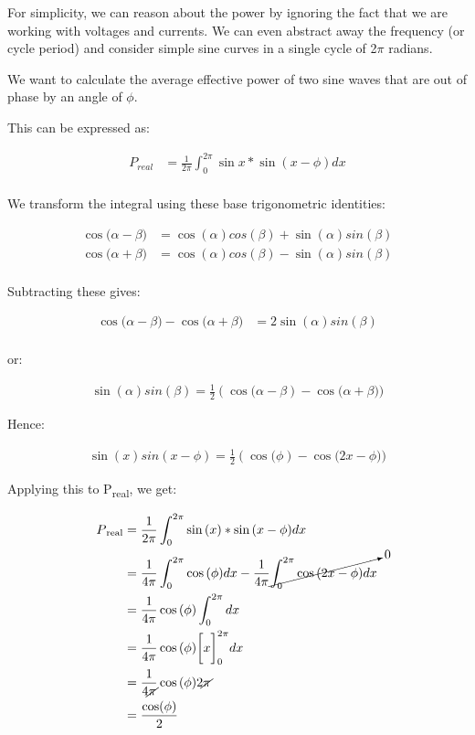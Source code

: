 \documentclass[a4paper]{article}
\def\SB#1{\textsubscript{{#1}}}
\begin{document}
For simplicity, we can reason about the power by ignoring the fact that we
are working with voltages and currents. We can even abstract away the
frequency (or cycle period) and consider simple sine curves in a single
cycle of 2$\pi$ radians.

We want to calculate the average effective power of two sine waves that are out of phase by an angle of $\phi$.\

This can be expressed as:\

\begin{align*}
  P_{real} &=\frac{1}{2 \pi}\int_0^{2\pi}\sin{x} * \sin{(x - \phi)}dx\\
\end{align*}

We transform the integral using these base trigonometric identities:

\begin{align*}
  \cos{(\alpha - \beta}) &= \cos{(\alpha)} cos{(\beta)} +  \sin{(\alpha)} sin{(\beta)}\\
  \cos{(\alpha + \beta}) &= \cos{(\alpha)} cos{(\beta)} -  \sin{(\alpha)} sin{(\beta)}\\
\end{align*}

Subtracting these gives:

\begin{align*}
  \cos{(\alpha - \beta}) - \cos{(\alpha + \beta}) &= 2 \sin{(\alpha)} sin{(\beta)}\\
\end{align*}

or:

\begin{align*}
  \sin{(\alpha)} sin{(\beta)} = \frac{1}{2} (\cos{(\alpha - \beta}) - \cos{(\alpha + \beta}))
\end{align*}

Hence:

\begin{align*}
  \sin{(x)} sin{(x -\phi)} = \frac{1}{2} (\cos{(\phi}) - \cos{(2 x - \phi}))
\end{align*}

Applying this to P\SB{real}, we get:

\begin{align*}
  P\SB{real} &= \frac{1}{2 \pi}\int_0^{2\pi}\sin{(x)} * \sin{(x - \phi)}dx\\
  &= \frac{1}{4\pi}\int_0^{2\pi}\cos{(\phi}) dx - \frac{1}{4\pi}\cancelto{0}{\int_0^{2\pi}\cos{(2 x -\phi}) dx}\\
  &= \frac{1}{4\pi}\cos{(\phi})\int_0^{2\pi} dx\\
  &= \frac{1}{4\pi}\cos{(\phi}) \bigg[x \bigg]_{0}^{2\pi} dx\\
  &= \frac{1}{4 \cancel{\pi}}\cos{(\phi}) 2\cancel{\pi}\\
  &= \frac{\cos(\phi)}{2}
\end{align*}\
\end{document}
